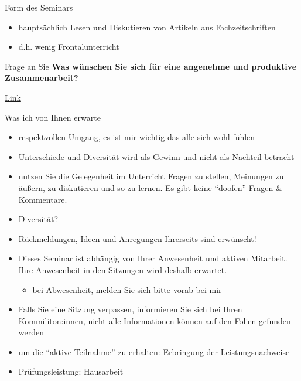\documentclass[
  ignorenonframetext,
]{beamer}
\providecommand{\tightlist}{%
  \setlength{\itemsep}{0pt}\setlength{\parskip}{0pt}}
\begin{document}
\begin{frame}
\begin{block}{Form des Seminars}
\label{form-des-seminars}
\begin{itemize}
\tightlist
\item
  hauptsächlich Lesen und Diskutieren von Artikeln aus Fachzeitschriften
\item
  d.h. wenig Frontalunterricht
\end{itemize}
\end{block}

\begin{block}{Frage an Sie}
\label{frage-an-sie}
\textbf{Was wünschen Sie sich für eine angenehme und produktive
Zusammenarbeit?}

\href{link}{Link}
\end{block}

\begin{block}{Was ich von Ihnen erwarte}
\label{was-ich-von-ihnen-erwarte}
\begin{itemize}[<+->]
\tightlist
\item
  respektvollen Umgang, es ist mir wichtig das alle sich wohl fühlen
\item
  Unterschiede und Diversität wird als Gewinn und nicht als Nachteil
  betracht
\item
  nutzen Sie die Gelegenheit im Unterricht Fragen zu stellen, Meinungen
  zu äußern, zu diskutieren und so zu lernen. Es gibt keine ``doofen''
  Fragen \& Kommentare.
\item
  Diversität?
\item
  Rückmeldungen, Ideen und Anregungen Ihrerseits sind erwünscht!
\item
  Dieses Seminar ist abhängig von Ihrer Anwesenheit und aktiven
  Mitarbeit. Ihre Anwesenheit in den Sitzungen wird deshalb erwartet.

  \begin{itemize}[<+->]
  \tightlist
  \item
    bei Abwesenheit, melden Sie sich bitte vorab bei mir
  \end{itemize}
\item
  Falls Sie eine Sitzung verpassen, informieren Sie sich bei Ihren
  Kommiliton:innen, nicht alle Informationen können auf den Folien
  gefunden werden
\item
  um die ``aktive Teilnahme'' zu erhalten: Erbringung der
  Leistungsnachweise
\item
  Prüfungsleistung: Hausarbeit
\end{itemize}
\end{block}


\end{frame}
\end{document}
